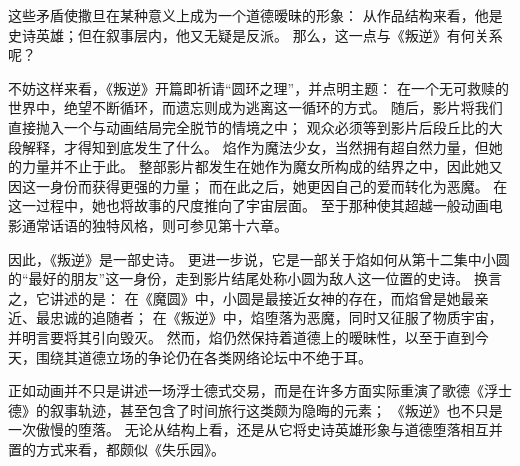 这些矛盾使撒旦在某种意义上成为一个道德暧昧的形象：
从作品结构来看，他是史诗英雄；但在叙事层内，他又无疑是反派。
那么，这一点与《叛逆》有何关系呢？

不妨这样来看，《叛逆》开篇即祈请“圆环之理”，并点明主题：
在一个无可救赎的世界中，绝望不断循环，而遗忘则成为逃离这一循环的方式。
随后，影片将我们直接抛入一个与动画结局完全脱节的情境之中；
观众必须等到影片后段丘比的大段解释，才得知到底发生了什么。
焰作为魔法少女，当然拥有超自然力量，但她的力量并不止于此。
整部影片都发生在她作为魔女所构成的结界之中，因此她又因这一身份而获得更强的力量；
而在此之后，她更因自己的爱而转化为恶魔。
在这一过程中，她也将故事的尺度推向了宇宙层面。
至于那种使其超越一般动画电影通常话语的独特风格，则可参见第十六章。

因此，《叛逆》是一部史诗。
更进一步说，它是一部关于焰如何从第十二集中小圆的“最好的朋友”这一身份，走到影片结尾处称小圆为敌人这一位置的史诗。
换言之，它讲述的是：
在《魔圆》中，小圆是最接近女神的存在，而焰曾是她最亲近、最忠诚的追随者；
在《叛逆》中，焰堕落为恶魔，同时又征服了物质宇宙，并明言要将其引向毁灭。
然而，焰仍然保持着道德上的暧昧性，以至于直到今天，围绕其道德立场的争论仍在各类网络论坛中不绝于耳。

正如动画并不只是讲述一场浮士德式交易，而是在许多方面实际重演了歌德《浮士德》的叙事轨迹，甚至包含了时间旅行这类颇为隐晦的元素；
《叛逆》也不只是一次傲慢的堕落。
无论从结构上看，还是从它将史诗英雄形象与道德堕落相互并置的方式来看，都颇似《失乐园》。
